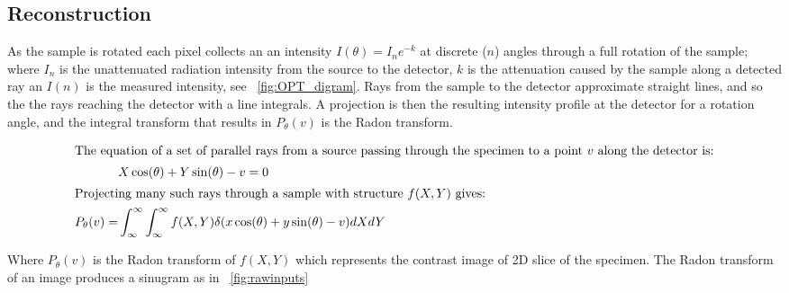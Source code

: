 \subsection{Reconstruction}

As the sample is rotated each pixel collects an an intensity \(I(\theta) = I_{n}e^{-k}\) at discrete (\(n\)) angles through a full rotation of the sample; where \(I_{n}\) is the unattenuated radiation intensity from the source to the detector, \(k\) is the attenuation caused by the sample along a detected ray an \(I(n)\) is the measured intensity, see \figurename~\ref{fig:OPT_digram}.
Rays from the sample to the detector approximate straight lines, and so the the rays reaching the detector with a line integrals.
A projection is then the resulting intensity profile at the detector for a rotation angle, and the integral transform that results in \(P_\theta(v)\)
is the \gls{Radon transform}.

\begin{align}
    \intertext{The equation of a set of parallel rays from a source passing through the specimen to a point \(v\) along the detector is:}
    &X\cos(\theta) + Y\sin(\theta) - v = 0 \\
    \intertext{Projecting many such rays through a sample with structure \(f(X,Y)\) gives:}
    P_\theta(v) = &\int_{\infty}^{\infty} \int_{\infty}^{\infty} f(X,Y)\delta (x\cos(\theta)+y \sin(\theta)-v)dX dY
\end{align}


Where \(P_\theta(v)\) is the \gls{Radon transform} of \(f(X,Y)\) which represents the contrast image of \gls{2D} slice of the specimen.
The \gls{Radon transform} of an image produces a sinugram as in \figurename~\ref{fig:rawinputs}

